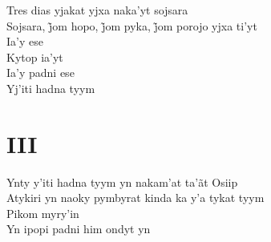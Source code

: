 \bigskip

\begin{linenumbers}\begingroup\raggedright
 
\noindent   Tres dias yjakat yjxa naka'yt sojsara\\
  Sojsara, j̃om hopo, j̃om pyka, j̃om porojo yjxa ti’yt\\
  Ia'y ese\\
  Kytop ia'yt\\
  Ia'y padni ese\\
  Yj'iti hadna tyym
 
 
\medskip
\section{III}

  \noindent Ynty y'iti hadna tyym yn nakam'at ta'ãt Osiip\\
  Atykiri yn naoky pymbyrat kinda ka y'a tykat tyym\\
  Pikom myry'in\\
  Yn ipopi padni him ondyt yn
 
\end{linenumbers}\endgroup

\bigskip

